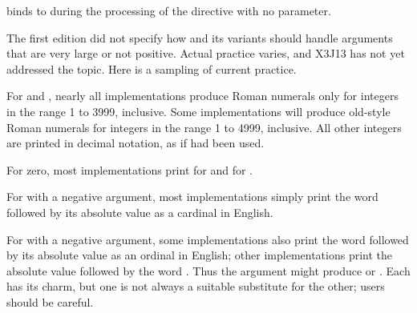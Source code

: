 \begin{flushdesc}
 binds  to 
during the processing of the  directive with no parameter.

\begin{new}
The first edition did not specify how  and its variants should
handle arguments that are very large or not positive.  Actual practice varies,
and X3J13 has not yet addressed the topic.
Here is a sampling of current practice.

For  and , nearly all implementations
produce Roman numerals only for integers in the range 1 to 3999, inclusive.
Some implementations will produce old-style Roman numerals for integers in
the range 1 to 4999, inclusive.  All other integers are printed in decimal
notation, as if  had been used.

For zero, most implementations print  for 
and  for .

For  with a negative argument, most implementations simply print
the word  followed by its absolute value as a cardinal in English.

For  with a negative argument, some implementations also print
the word  followed by its absolute value as an ordinal in English;
other implementations print the absolute value followed by the word .
Thus the argument  might produce  or .
Each has its charm, but one is not always a suitable substitute for the other;
users should be careful.


\end{new}
\end{flushdesc}
